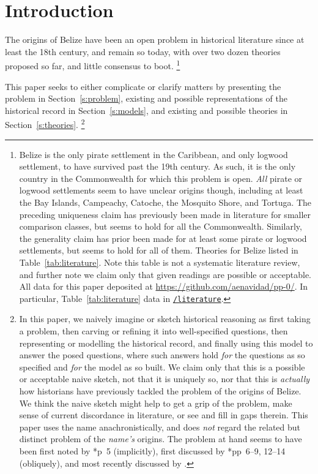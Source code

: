 
%
%
%
\section{Introduction}
\label{s:intro}
	The origins of Belize have been an open problem in historical literature since at least the 18th century, and remain so today, with over two dozen theories proposed so far, and little consensus to boot.%
	\footnote{Belize is the only pirate settlement in the Caribbean, and only logwood settlement, to have survived past the 19th century. As such, it is the only country in the Commonwealth for which this problem is open. \emph{All} pirate or logwood settlements seem to have unclear origins though, including at least the Bay Islands, Campeachy, Catoche, the Mosquito Shore, and Tortuga. The preceding uniqueness claim has previously been made in literature for smaller comparison classes, but seems to hold for all the Commonwealth. Similarly, the generality claim has prior been made for at least some pirate or logwood settlements, but seems to hold for all of them. Theories for Belize listed in Table~\ref{tab:literature}. Note this table is not a systematic literature review, and further note we claim only that given readings are possible or acceptable. All data for this paper deposited at \url{https://github.com/aenavidad/pp-0/}. In particular, Table~\ref{tab:literature} data in \href{https://github.com/aenavidad/pp-0/tree/main/literature}{\nolinkurl{/literature}}.}
	
	This paper seeks to either complicate or clarify matters by presenting the problem in Section~\ref{s:problem}, existing and possible representations of the historical record in Section~\ref{s:models}, and existing and possible theories in Section~\ref{s:theories}.%
	\footnote{In this paper, we naively imagine or sketch historical reasoning as first taking a problem, then carving or refining it into well-specified questions, then representing or modelling the historical record, and finally using this model to answer the posed questions, where such answers hold \emph{for} the questions as so specified and \emph{for} the model as so built. We claim only that this is a possible or acceptable naive sketch, not that it is uniquely so, nor that this is \emph{actually} how historians have previously tackled the problem of the origins of Belize. We think the naive sketch might help to get a grip of the problem, make sense of current discordance in literature, or see and fill in gaps therein. This paper uses the name  anachronistically, and does \emph{not} regard the related but distinct problem of the \emph{name's} origins. The problem at hand seems to have been first noted by \cite{alm26}*{p~5} (implicitly), first discussed by \cite{nun77}*{pp~6--9, 12--14} (obliquely), and most recently discussed by .}
%
%
%
